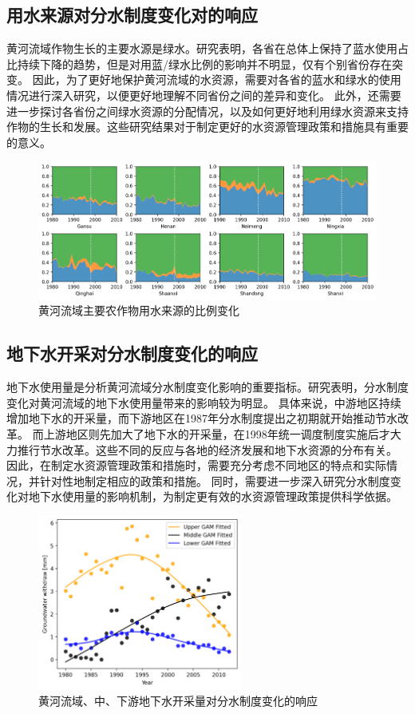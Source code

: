 \subsection{用水来源对分水制度变化对的响应}

黄河流域作物生长的主要水源是绿水。研究表明，各省在总体上保持了蓝水使用占比持续下降的趋势，但是对用蓝/绿水比例的影响并不明显，仅有个别省份存在突变。
因此，为了更好地保护黄河流域的水资源，需要对各省的蓝水和绿水的使用情况进行深入研究，以便更好地理解不同省份之间的差异和变化。
此外，还需要进一步探讨各省份之间绿水资源的分配情况，以及如何更好地利用绿水资源来支持作物的生长和发展。这些研究结果对于制定更好的水资源管理政策和措施具有重要的意义。

\begin{figure}[htb]
    \centering
    \includegraphics[width=\textwidth]{img/ch6/ch6_green_blue_water.png}
    \caption{黄河流域主要农作物用水来源的比例变化}\label{ch6:fig:sources}
\end{figure}

\subsection{地下水开采对分水制度变化的响应}

地下水使用量是分析黄河流域分水制度变化影响的重要指标。研究表明，分水制度变化对黄河流域的地下水使用量带来的影响较为明显。
具体来说，中游地区持续增加地下水的开采量，而下游地区在1987年分水制度提出之初期就开始推动节水改革。
而上游地区则先加大了地下水的开采量，在1998年统一调度制度实施后才大力推行节水改革。这些不同的反应与各地的经济发展和地下水资源的分布有关。
因此，在制定水资源管理政策和措施时，需要充分考虑不同地区的特点和实际情况，并针对性地制定相应的政策和措施。
同时，需要进一步深入研究分水制度变化对地下水使用量的影响机制，为制定更有效的水资源管理政策提供科学依据。

\begin{figure}[htb]
    \centering
    \includegraphics[width=0.6\textwidth]{img/ch6/ch6_groundwater.png}
    \caption{黄河流域、中、下游地下水开采量对分水制度变化的响应}\label{ch6:fig:groundwater}
\end{figure}